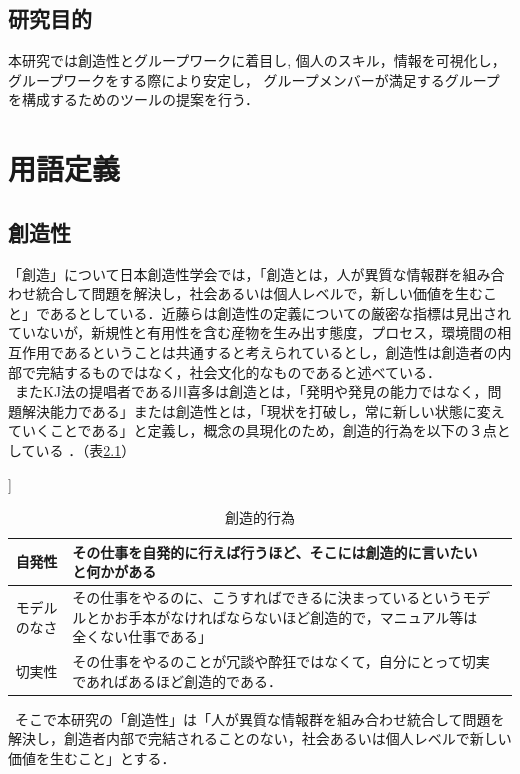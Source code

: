 \documentclass{funthesis}
\begin{document}
\section{研究目的}
本研究では創造性とグループワークに着目し,  個人のスキル，情報を可視化し，グループワークをする際により安定し，
グループメンバーが満足するグループを構成するためのツールの提案を行う．
\chapter{用語定義}
\section{創造性}
「創造」について日本創造性学会では，「創造とは，人が異質な情報群を組み合わせ統合して問題を解決し，社会あるいは個人レベルで，新しい価値を生むこと」であるとしている\cite{A12}．近藤ら\cite{A13}は創造性の定義についての厳密な指標は見出されていないが，新規性と有用性を含む産物を生み出す態度，プロセス，環境間の相互作用であるということは共通すると考えられているとし，創造性は創造者の内部で完結するものではなく，社会文化的なものであると述べている．\\
\ またKJ法の提唱者である川喜多は創造とは，「発明や発見の能力ではなく，問題解決能力である」または創造性とは，「現状を打破し，常に新しい状態に変えていくことである」と定義し，概念の具現化のため，創造的行為を以下の３点としている\cite{A14} \cite{A15}．（表\ref{souzousei}）
\begin{table}[H]
\begin{center}] 
 \caption{創造的行為}
  \begin{tabular}{|c|p{105mm}|p{10mm}|} \hline
    自発性& その仕事を自発的に行えば行うほど、そこには創造的に言いたいと何かがある\tabularnewline \hline
    モデルのなさ& その仕事をやるのに、こうすればできるに決まっているというモデルとかお手本がなければならないほど創造的で，マニュアル等は全くない仕事である」 \tabularnewline \hline
    切実性&その仕事をやるのことが冗談や酔狂ではなくて，自分にとって切実であればあるほど創造的である．\tabularnewline
    \hline
  \end{tabular}

  \label{souzousei}
  \end{center}
\end{table}


\ そこで本研究の「創造性」は「人が異質な情報群を組み合わせ統合して問題を解決し，創造者内部で完結されることのない，社会あるいは個人レベルで新しい価値を生むこと」とする．
\end{document}
